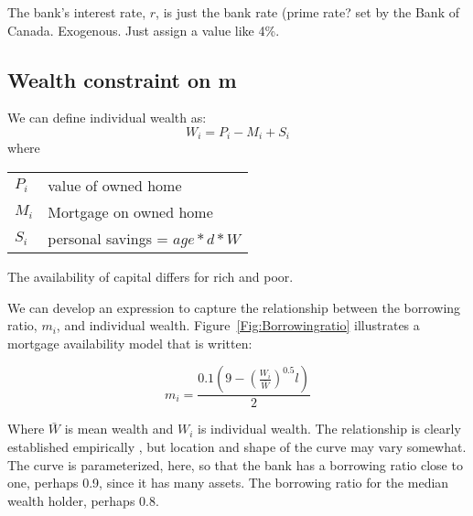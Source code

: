 The bank's interest rate, $r$, is just the bank rate (prime rate? set by the Bank of Canada. Exogenous. Just assign  a value like 4\%.

\subsection{Wealth constraint on m} \label{SS:MWealthConstraint}

We can define individual wealth as:
\[W_i= P_i -M_i  +S_i\]
where 

\begin{tabular}{ll}
$P_i$ & value of owned home\\
$M_i$ & Mortgage on owned home\\
$S_i$ & personal savings = $age*d*W$\\
\end{tabular}

The availability of capital differs for rich and poor. 


We can develop an expression to capture the relationship between the \gls{borrowing ratio}, $m_i$,  and individual wealth. Figure~\ref{Fig:Borrowingratio} illustrates a mortgage availability  model that is written:

 \[ m_i = \frac{0.1 \left(9-\left(\frac{W_i}{\bar W}\right)^{0.5}l\right)}{2} \]

 
Where $\bar{W}$ is mean wealth and $W_i$ is individual wealth. 
The relationship is clearly established empirically \cite{}, but location and shape of the curve may vary somewhat. The curve is parameterized, here, so that the bank has a borrowing ratio close to one, perhaps 0.9, since it has many assets. The borrowing ratio for the median wealth holder, perhaps 0.8.



